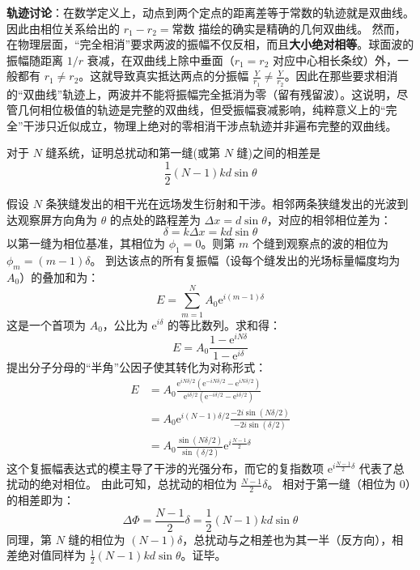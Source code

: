 \begin{solution}
\begin{enumerate}
    \textbf{轨迹讨论}：在数学定义上，动点到两个定点的距离差等于常数的轨迹就是双曲线。因此由相位关系给出的 $r_1 - r_2 = \text{常数}$ 描绘的确实是精确的几何双曲线。
    然而，在物理层面，“完全相消”要求两波的振幅不仅反相，而且\textbf{大小绝对相等}。球面波的振幅随距离 $1/r$ 衰减，在双曲线上除中垂面（$r_1=r_2$ 对应中心相长条纹）外，一般都有 $r_1 \neq r_2$。这就导致真实抵达两点的分振幅 $\frac{Y}{r_1} \neq \frac{Y}{r_2}$。因此在那些要求相消的“双曲线”轨迹上，两波并不能将振幅完全抵消为零（留有残留波）。这说明，尽管几何相位极值的轨迹是完整的双曲线，但受振幅衰减影响，纯粹意义上的“完全”干涉只近似成立，物理上绝对的零相消干涉点轨迹并非遍布完整的双曲线。
\end{enumerate}
\end{solution}

\begin{exercise}\label{ex:8.18}
对于 $N$ 缝系统，证明总扰动和第一缝(或第 $N$ 缝)之间的相差是
$$ \frac{1}{2}(N - 1)kd \sin\theta $$
\end{exercise}
\begin{solution}
假设 $N$ 条狭缝发出的相干光在远场发生衍射和干涉。相邻两条狭缝发出的光波到达观察屏方向角为 $\theta$ 的点处的路程差为 $\Delta x = d \sin\theta$，对应的相邻相位差为：
$$ \delta = k \Delta x = kd \sin\theta $$
以第一缝为相位基准，其相位为 $\phi_1 = 0$。则第 $m$ 个缝到观察点的波的相位为 $\phi_m = (m - 1)\delta$。
到达该点的所有复振幅（设每个缝发出的光场标量幅度均为 $A_0$）的叠加和为：
$$ E = \sum_{m=1}^N A_0 \mathrm{e}^{i(m-1)\delta} $$
这是一个首项为 $A_0$，公比为 $\mathrm{e}^{i\delta}$ 的等比数列。求和得：
$$ E = A_0 \frac{1 - \mathrm{e}^{iN\delta}}{1 - \mathrm{e}^{i\delta}} $$
提出分子分母的“半角”公因子使其转化为对称形式：
\begin{align*}
    E &= A_0 \frac{\mathrm{e}^{iN\delta/2} \left( \mathrm{e}^{-iN\delta/2} - \mathrm{e}^{iN\delta/2} \right)}{\mathrm{e}^{i\delta/2} \left( \mathrm{e}^{-i\delta/2} - \mathrm{e}^{i\delta/2} \right)} \\
      &= A_0 \mathrm{e}^{i(N-1)\delta/2} \frac{-2i \sin(N\delta/2)}{-2i \sin(\delta/2)} \\
      &= A_0 \frac{\sin(N\delta/2)}{\sin(\delta/2)} \mathrm{e}^{i \frac{N-1}{2} \delta}
\end{align*}
这个复振幅表达式的模主导了干涉的光强分布，而它的复指数项 $\mathrm{e}^{i \frac{N-1}{2} \delta}$ 代表了总扰动的绝对相位。
由此可知，总扰动的相位为 $\frac{N-1}{2} \delta$。
相对于第一缝（相位为 0）的相差即为：
$$ \Delta\Phi = \frac{N-1}{2} \delta = \frac{1}{2}(N - 1)kd \sin\theta $$
同理，第 $N$ 缝的相位为 $(N-1)\delta$，总扰动与之相差也为其一半（反方向），相差绝对值同样为 $\frac{1}{2}(N-1)kd\sin\theta$。证毕。
\end{solution}

